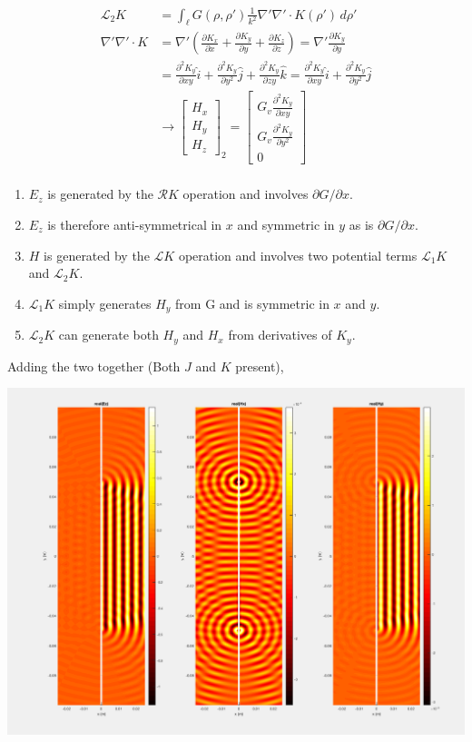 \documentclass{article}
\newcommand{\0}{\varnothing}
\begin{document}
\begin{minipage}{0.45\textwidth}
\begin{align*}
    \mathcal{L}_2 K &= \int_{\ell}G(\rho,\rho')\frac{1}{k^2}\nabla'\nabla'\cdotp K(\rho') \,d\rho'\\
    \nabla'\nabla'\cdotp K &= \nabla' (\frac{\partial K_x}{\partial x} + \frac{\partial K_y}{\partial y} + \frac{\partial K_z}{\partial z}) = \nabla' \frac{\partial K_y}{\partial y} \\
    &= \frac{\partial^2 K_y}{\partial xy} \hat i + 
    \frac{\partial^2 K_y}{\partial y^2} \hat j + \frac{\partial^2 K_y}{\partial zy} \hat k =  
    \frac{\partial^2 K_y}{\partial xy} \hat i + \frac{\partial^2 K_y}{\partial y^2} \hat j \\
    &\rightarrow 
    \left[ \begin{array}{c} H_x \\ H_y \\ H_z \end{array} \right]_2 = 
    \left[ \begin{array}{c} G_v\frac{\partial^2 K_y}{\partial xy} \\ G_v\frac{\partial^2 K_y}{\partial y^2} \\ 0 \end{array} \right]\\
\end{align*}
\end{minipage}
\begin{minipage}{0.45\textwidth}
\begin{enumerate}
    \item $E_z$ is generated by the $\mathcal{R}K$ operation and involves $\partial G/\partial x$. 
    \item $E_z$ is therefore anti-symmetrical in $x$ and symmetric in $y$ as is $\partial G/\partial x$.
    \item $H$ is generated by the $\mathcal{L}K$ operation and involves two potential terms $\mathcal{L}_1K$ and $\mathcal{L}_2K$. 
    \item $\mathcal{L}_1K$ simply generates $H_y$ from G and is symmetric in $x$ and $y$.
    \item $\mathcal{L}_2K$ can generate both  $H_y$ and $H_x$ from derivatives of $K_y$.
\end{enumerate}
\end{minipage}

\newpage
Adding the two together (Both $J$ and $K$ present),
\begin{center}
\includegraphics[width=0.25\columnwidth]{figures/Both}
\end{center}
\end{document}
